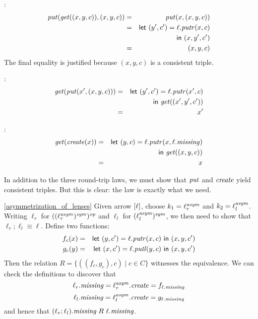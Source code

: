 \begin{defn}[$R$-similarity]
\begin{theorem}
\begin{lemma}
\begin{theorem}[No products]
\begin{lemma}
\begin{defn}
\begin{theorem}
\begin{theorem}
\begin{corollary}[Hylomorphism]
\begin{defn}
\begin{defn}
\begin{defn}[Symmetrization]
\begin{theorem}
\begin{goodlens}
\noindent{}:
\begin{eqnarray*}
    \mathit{put}(\mathit{get}((x,y,c)),(x,y,c)) &=& \mathit{put}(x,(x,y,c)) \\
    &=& \mathsf{let}\  (y',c') = \ell.\mathit{putr}(x,c) \\
    & & \mathsf{in}\  (x,y',c') \\
    &=& (x,y,c)
\end{eqnarray*}
The final equality is justified because $(x,y,c)$ is a consistent triple.

\noindent{}:
\begin{eqnarray*}
    \mathit{get}(\mathit{put}(x',(x,y,c)))
    &=& \mathsf{let}\  (y',c') = \ell.\mathit{putr}(x',c) \\
    & & \mathsf{in}\  \mathit{get}((x',y',c')) \\
    &=& x'
\end{eqnarray*}

\noindent{}:
\begin{eqnarray*}
    \mathit{get}(\mathit{create}(x))
    &=& \mathsf{let}\  (y,c) = \ell.\mathit{putr}(x,\ell.\mathit{missing}) \\
    & & \mathsf{in}\  \mathit{get}((x,y,c)) \\
    &=& x
\end{eqnarray*}

In addition to the three round-trip laws, we must show that $\mathit{put}$ and
$\mathit{create}$ yield consistent triples. But this is clear: the  law
is exactly what we need.
\end{goodlens}
\fi

\begin{pfof}{\ref{asymmetrization_of_lenses}}
Given \iffull arrow \fi $[\ell]$, choose $k_1 = \ell^\mathit{asym}_r$ and $k_2 =
\ell^\mathit{asym}_l$.
\iffull
Writing $\ell_r$ for $((\ell^\mathit{asym}_r)^\mathit{sym})^\mathit{op}$ and $\ell_l$ for
$(\ell^\mathit{asym}_l)^\mathit{sym}$, we then need to show that $\ell_r;\ell_l \equiv \ell$.
Define two functions:
\begin{eqnarray*}
    f_c(x) &=& \mathsf{let}\  (y,c') = \ell.\mathit{putr}(x,c) \ \mathsf{in}\  (x,y,c') \\
    g_c(y) &=& \mathsf{let}\  (x,c') = \ell.\mathit{putl}(y,c) \ \mathsf{in}\  (x,y,c')
\end{eqnarray*}
Then the relation $R = \{((f_c,g_c),c) \mid c \in C\}$ witnesses the
equivalence. We can check the definitions to discover that
\[\ell_r.\mathit{missing} = \ell^\mathit{asym}_r.\mathit{create} = f_{\ell.\mathit{missing}}\]
\[\ell_l.\mathit{missing} = \ell^\mathit{asym}_l.\mathit{create} = g_{\ell.\mathit{missing}}\]
and hence that $(\ell_r;\ell_l).\mathit{missing} \mathrel{R_{}} \ell.\mathit{missing}$.


\end{pfof}
\end{theorem}
\end{defn}
\end{defn}
\end{defn}
\end{corollary}
\end{theorem}
\end{theorem}
\end{defn}
\end{lemma}
\end{theorem}
\end{lemma}
\end{theorem}
\end{defn}
